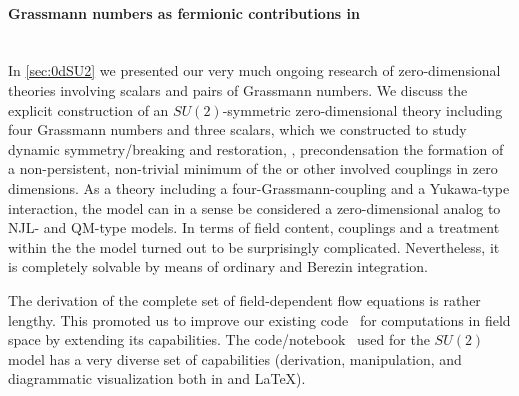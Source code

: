 \paragraph{Grassmann numbers as fermionic contributions in \dzero{}}\label{paragraph:0dconclusionFermions}\mbox{}\\%
In \cref{sec:0dSU2} we presented our very much ongoing research of zero-dimensional theories involving scalars and pairs of Grassmann numbers.
We discuss the explicit construction of an $SU(2)$-symmetric zero-dimensional theory including four Grassmann numbers and three scalars, which we constructed to study dynamic symmetry/breaking and restoration, \ie{}, precondensation \dash{} the formation of a non-persistent, non-trivial minimum of the \eaa{} or other involved couplings in zero dimensions.
As a theory including a four-Grassmann-coupling and a Yukawa-type interaction, the model can in a sense be considered a zero-dimensional analog to NJL- and QM-type models.
In terms of field content, couplings and a treatment within the \frg{} the model turned out to be surprisingly complicated.
Nevertheless, it is completely solvable by means of ordinary and Berezin integration.

The derivation of the complete set of field-dependent \frg{} flow equations is rather lengthy.
This promoted us to improve our existing \WAM{} code~\cite{Steil:2023PhDFlowEquationsNB} for computations in field space by extending its capabilities.
The \WAM{} code/notebook~\cite{Steil:2023zeroDSU2} used for the $SU(2)$ model has a very diverse set of capabilities (derivation, manipulation, and diagrammatic visualization \dash{} both in \WAM{} and \LaTeX{}).\bigskip

